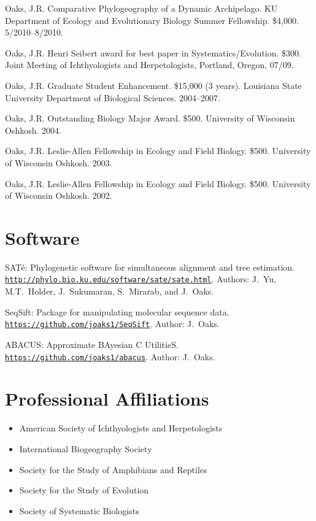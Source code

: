 \documentclass[10pt]{article}
\newenvironment{myItemize}{
  \begin{itemize}
    \setlength{\leftskip}{-4mm}
    \setlength{\itemsep}{0.25em}
    \setlength{\parskip}{0pt}
    \setlength{\parsep}{0.5em}}
  {\end{itemize}}
\newcommand{\ignore}[1]{}
\newcommand{\myHangIndent}{\hangindent=5mm}
\begin{document}
\ignore{
\myHangIndent
Oaks, J.R.
Comparative Phylogeography of a Dynamic Archipelago.
KU Office of Graduate Studies Summer Research Fellowship.
\$5,000.
5/2010--8/2010.
Not funded.
}

\myHangIndent
Oaks, J.R.
Comparative Phylogeography of a Dynamic Archipelago.
KU Department of Ecology and Evolutionary Biology Summer Fellowship.
\$4,000.
5/2010--8/2010.

\myHangIndent
Oaks, J.R.
Henri Seibert award for best paper in Systematics/Evolution.
\$300.
Joint Meeting of Ichthyologists and Herpetologists, Portland, Oregon, 07/09.

\myHangIndent
Oaks, J.R.
Graduate Student Enhancement.
\$15,000 (3 years).
Louisiana State University Department of Biological Sciences.
2004--2007.

\myHangIndent
Oaks, J.R.
Outstanding Biology Major Award.
\$500.
University of Wisconsin Oshkosh.
2004.

\myHangIndent
Oaks, J.R.
Leslie-Allen Fellowship in Ecology and Field Biology.
\$500.
University of Wisconsin Oshkosh.
2003.

\myHangIndent
Oaks, J.R.
Leslie-Allen Fellowship in Ecology and Field Biology.
\$500.
University of Wisconsin Oshkosh.
2002.

\section*{Software}
\myHangIndent
{SAT}\'{e}: Phylogenetic software for simultaneous alignment and tree
estimation.
\href{http://phylo.bio.ku.edu/software/sate/sate.html}
{\tt http://phylo.bio.ku.edu/software/sate/sate.html}.
Authors: J.\ Yu, M.T.\ Holder, J.\ Sukumaran, S.\ Mirarab, and J.\ Oaks.

\myHangIndent
SeqSift: Package for manipulating molecular sequence data.
\href{https://github.com/joaks1/SeqSift}{\tt https://github.com/joaks1/SeqSift}.
Author: J.\ Oaks.

\myHangIndent
ABACUS: Approximate BAyesian C UtilitieS.
\href{https://github.com/joaks1/abacus}{\tt https://github.com/joaks1/abacus}.
Author: J.\ Oaks.

\section*{Professional Affiliations}
\begin{myItemize}
\item American Society of Ichthyologists and Herpetologists
\item International Biogeography Society
\item Society for the Study of Amphibians and Reptiles
\item Society for the Study of Evolution
\item Society of Systematic Biologists
\end{myItemize}
\end{document}
